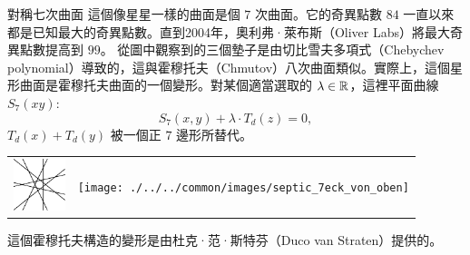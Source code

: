 \begin{surferPage}[七次曲面]{對稱七次曲面}
這個像星星一樣的曲面是個 $7$ 次曲面。它的奇異點數 $84$ 一直以來都是已知最大的奇異點數。直到2004年，奧利弗·萊布斯（Oliver Labs）將最大奇異點數提高到 $99$。
從圖中觀察到的三個墊子是由切比雪夫多項式（Chebychev polynomial）導致的，這與霍穆托夫（Chmutov）八次曲面類似。實際上，這個星形曲面是霍穆托夫曲面的一個變形。對某個適當選取的 $\lambda\in{\mathbb R}$，這裡平面曲線 $S_7(xy):$
\[S_7(x,y) + \lambda \cdot T_d(z) = 0,\]
$T_d(x)+T_d(y)$ 被一個正 $7$ 邊形所替代。
\vspace*{-0.3em}
    \begin{center}
      \begin{tabular}{c@{\qquad}c}
        \includegraphics[height=1.5cm]{./../../common/images/labsseptic1.pdf}
        &
        \texttt{[image: ./../../common/images/septic\_7eck\_von\_oben]}
      \end{tabular}
    \end{center}
    \vspace*{-0.3em}
這個霍穆托夫構造的變形是由杜克·范·斯特芬（Duco van Straten）提供的。
\end{surferPage}
